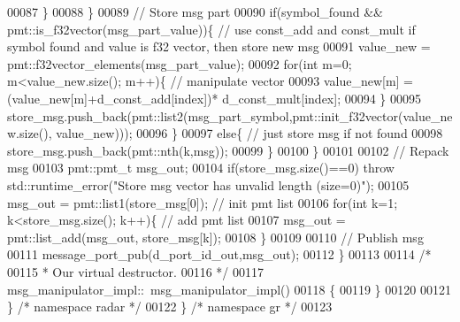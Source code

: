 \begin{DoxyCode}
00087                 \}
00088             \}
00089             \textcolor{comment}{// Store msg part}
00090             \textcolor{keywordflow}{if}(symbol\_found && pmt::is\_f32vector(msg\_part\_value))\{ \textcolor{comment}{// use const\_add and const\_mult if
       symbol found and value is f32 vector, then store new msg}
00091                 value\_new = pmt::f32vector\_elements(msg\_part\_value);
00092                 \textcolor{keywordflow}{for}(\textcolor{keywordtype}{int} m=0; m<value\_new.size(); m++)\{ \textcolor{comment}{// manipulate vector}
00093                     value\_new[m] = (value\_new[m]+d_const_add[index])*
      d_const_mult[index];
00094                 \}
00095                 store\_msg.push\_back(pmt::list2(msg\_part\_symbol,pmt::init\_f32vector(value\_new.size(), 
      value\_new)));
00096             \}
00097             \textcolor{keywordflow}{else}\{ \textcolor{comment}{// just store msg if not found}
00098                 store\_msg.push\_back(pmt::nth(k,msg));
00099             \}
00100         \}
00101         
00102         \textcolor{comment}{// Repack msg}
00103         pmt::pmt\_t msg\_out;
00104         \textcolor{keywordflow}{if}(store\_msg.size()==0) \textcolor{keywordflow}{throw} std::runtime\_error(\textcolor{stringliteral}{"Store msg vector has unvalid length (size=0)"});
00105         msg\_out = pmt::list1(store\_msg[0]); \textcolor{comment}{// init pmt list}
00106         \textcolor{keywordflow}{for}(\textcolor{keywordtype}{int} k=1; k<store\_msg.size(); k++)\{ \textcolor{comment}{// add pmt list}
00107             msg\_out = pmt::list\_add(msg\_out, store\_msg[k]);
00108         \}
00109         
00110         \textcolor{comment}{// Publish msg}
00111         message\_port\_pub(d_port_id_out,msg\_out);
00112     \}
00113 
00114     \textcolor{comment}{/*}
00115 \textcolor{comment}{     * Our virtual destructor.}
00116 \textcolor{comment}{     */}
00117     msg_manipulator_impl::~msg_manipulator_impl()
00118     \{
00119     \}
00120 
00121   \} \textcolor{comment}{/* namespace radar */}
00122 \} \textcolor{comment}{/* namespace gr */}
00123 
\end{DoxyCode}
